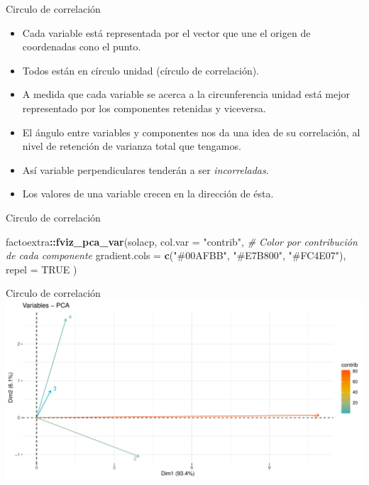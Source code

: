 \documentclass[
  ignorenonframetext,
]{beamer}
\newenvironment{Shaded}{\begin{snugshade}}{\end{snugshade}}
\newcommand{\AttributeTok}[1]{\textcolor[rgb]{0.13,0.29,0.53}{#1}}
\newcommand{\CommentTok}[1]{\textcolor[rgb]{0.56,0.35,0.01}{\textit{#1}}}
\newcommand{\ConstantTok}[1]{\textcolor[rgb]{0.56,0.35,0.01}{#1}}
\newcommand{\FunctionTok}[1]{\textcolor[rgb]{0.13,0.29,0.53}{\textbf{#1}}}
\newcommand{\NormalTok}[1]{#1}
\newcommand{\SpecialCharTok}[1]{\textcolor[rgb]{0.81,0.36,0.00}{\textbf{#1}}}
\newcommand{\StringTok}[1]{\textcolor[rgb]{0.31,0.60,0.02}{#1}}
\providecommand{\tightlist}{%
  \setlength{\itemsep}{0pt}\setlength{\parskip}{0pt}}
\begin{document}
\begin{frame}{Circulo de correlación}
\label{circulo-de-correlaciuxf3n}
\begin{itemize}
\tightlist
\item
  Cada variable está representada por el vector que une el origen de
  coordenadas cono el punto.
\item
  Todos están en círculo unidad (círculo de correlación).
\item
  A medida que cada variable se acerca a la circunferencia unidad está
  mejor representado por los componentes retenidas y viceversa.
\item
  El ángulo entre variables y componentes nos da una idea de su
  correlación, al nivel de retención de varianza total que tengamos.
\item
  Así variable perpendiculares tenderán a ser \emph{incorreladas}.
\item
  Los valores de una variable crecen en la dirección de ésta.
\end{itemize}
\end{frame}

\begin{frame}[fragile]{Circulo de correlación}
\label{circulo-de-correlaciuxf3n-1}
\begin{Shaded}
\begin{Highlighting}[]
\NormalTok{factoextra}\SpecialCharTok{::}\FunctionTok{fviz\_pca\_var}\NormalTok{(solacp,}
             \AttributeTok{col.var =} \StringTok{"contrib"}\NormalTok{,}
             \CommentTok{\# Color por contribución de cada   componente}
             \AttributeTok{gradient.cols =} \FunctionTok{c}\NormalTok{(}\StringTok{"\#00AFBB"}\NormalTok{,}
                               \StringTok{"\#E7B800"}\NormalTok{,}
                               \StringTok{"\#FC4E07"}\NormalTok{),}
             \AttributeTok{repel =} \ConstantTok{TRUE}    
\NormalTok{             )}
\end{Highlighting}
\end{Shaded}
\end{frame}

\begin{frame}{Circulo de correlación}
\label{circulo-de-correlaciuxf3n-2}
\includegraphics{AnalisisComponentesPrincipales_fusion_files/figure-beamer/biplor-1.pdf}
\end{frame}
\end{document}
